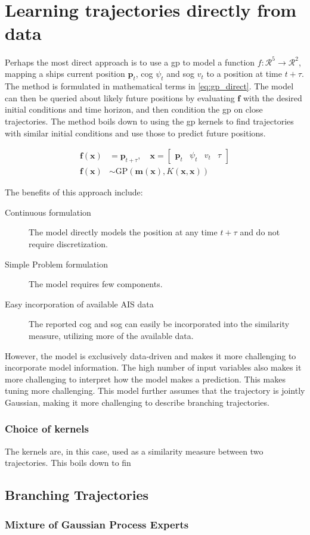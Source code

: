 \chapter{Learning trajectories directly from data}
Perhaps the most direct approach is to use a \acrshort{gp} to model a function $f: \mathcal{R}^5 \to \mathcal{R}^2$, mapping a ships current position $\boldsymbol{p}_t$, \acrshort{cog} $\psi_t$ and \acrshort{sog} $v_t$ to a position at time $t+\tau$. The method is formulated in mathematical terms in \cref{eq:gp_direct}. The model can then be queried about likely future positions by evaluating $\boldsymbol{f}$ with the desired initial conditions and time horizon, and then condition the \acrshort{gp} on close trajectories. 
The method boils down to using the \acrshort{gp} kernels to find trajectories with similar initial conditions and use those to predict future positions.

\begin{subequations}\label{eq:gp_direct}
\begin{align}
    \boldsymbol{f}(\boldsymbol{x}) &= \boldsymbol{p}_{t+\tau} \label{eq:gp_direct_f}, \quad \boldsymbol{x} = \begin{bmatrix} \boldsymbol{p}_t & \psi_t & v_t & \tau\end{bmatrix}\\
    \boldsymbol{f}(\boldsymbol{x}) &\sim \text{GP}(\boldsymbol{m}(\boldsymbol{x}), K(\boldsymbol{x}, \boldsymbol{x}))\label{eq:gp_direct_f_dist}
\end{align} 
\end{subequations}

The benefits of this approach include:
\begin{description}
    \item[Continuous formulation] The model directly models the position at any time $t+\tau$ and do not require discretization. 
    \item[Simple Problem formulation] The model requires few components.
    \item[Easy incorporation of available AIS data] The reported \acrshort{cog} and \acrshort{sog} can easily be incorporated into the similarity measure, utilizing more of the available data.
\end{description}

However, the model is exclusively data-driven and makes it more challenging to incorporate model information. The high number of input variables also makes it more challenging to interpret how the model makes a prediction. This makes tuning more challenging. This model further assumes that the trajectory is jointly Gaussian, making it more challenging to describe branching trajectories.

\subsection{Choice of kernels}
The kernels are, in this case, used as a similarity measure between two trajectories. This boils down to fin




\section{Branching Trajectories}


\subsection{Mixture of Gaussian Process Experts}

